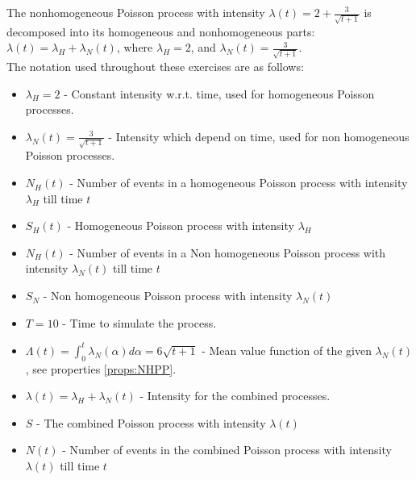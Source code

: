 The nonhomogeneous Poisson process with intensity $\lambda(t) = 2 + \frac{3}{\sqrt{t+1}}$ 
is decomposed into its homogeneous and nonhomogeneous parts: $\lambda(t) = \lambda_H + \lambda_N(t)$, 
where $\lambda_H = 2$, and $\lambda_N(t) = \frac{3}{\sqrt{t+1}}$.
\\

The notation used throughout these exercises are as follows:
\begin{itemize}
    \item $\lambda_H = 2$ - Constant intensity w.r.t. time, used for homogeneous Poisson processes.
    \item $\lambda_N(t)= \frac{3}{\sqrt{t+1}}$ - Intensity which depend on time, used for non homogeneous Poisson processes.
    \item $N_H(t)$ - Number of events in a homogeneous Poisson process with intensity $\lambda_H$ till time $t$
    \item $S_H(t)$ - Homogeneous Poisson process with intensity $\lambda_H$
    \item $N_H(t)$ - Number of events in a Non homogeneous Poisson process with intensity $\lambda_N(t)$ till time $t$
    \item $S_N$ - Non homogeneous Poisson process with intensity $\lambda_N(t)$
    \item $T = 10$ - Time to simulate the process.
    \item $\Lambda(t) = \int_0^t\lambda_N(\alpha)d\alpha = 6\sqrt{t+1}$ - Mean value function of the given $\lambda_N(t)$, see properties \ref{props:NHPP}.
    \item $\lambda(t) = \lambda_H+\lambda_N(t)$ - Intensity for the combined processes.
    \item $S$ - The combined Poisson process with intensity $\lambda(t)$
    \item $N(t)$ - Number of events in the combined Poisson process with intensity $\lambda(t)$ till time $t$
    
    
\end{itemize}

